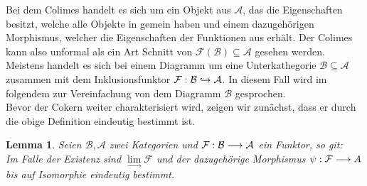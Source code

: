 \documentclass[10pt,a4paper]{report}
\newcounter{Aussage}[chapter]
\newtheorem{lemma}[Aussage]{Lemma}
\newcommand{\functionfront}[3]{\nolinebreak{#1:#2 \longrightarrow #3}}
\newcommand{\colimes}[0]{\lim\limits_{ \longrightarrow }}
\newcommand{\infunctionfront}[3]{\nolinebreak{#1:#2 \hookrightarrow #3}}
\begin{document}
Bei dem Colimes handelt es sich um ein Objekt aus $\mathcal{A}$, das die Eigenschaften besitzt, welche alle Objekte in  gemein haben und einem dazugehörigen Morphismus, welcher die Eigenschaften der Funktionen aus  erhält. Der Colimes kann also unformal als ein Art Schnitt von $\mathcal{F}(\mathcal{B}) \subseteq \mathcal{A}$ gesehen werden.\\
Meistens handelt es sich bei einem Diagramm um eine Unterkathegorie $\mathcal{B} \subseteq \mathcal{A}$ zusammen mit dem Inklusionsfunktor $\infunctionfront{\mathcal{F}}{\mathcal{B}}{\mathcal{A}}$. In diesem Fall wird im folgendem zur Vereinfachung von dem Diagramm $\mathcal{B}$ gesprochen.\\
Bevor der Cokern weiter charakterisiert wird, zeigen wir zunächst, dass er durch die obige Definition eindeutig bestimmt ist.
\begin{lemma}
Seien $\mathcal{B},\mathcal{A}$ zwei Kategorien und $\functionfront{\mathcal{F}}{\mathcal{B}}{\mathcal{A}}$ ein Funktor, so git:\\ 
Im Falle der Existenz sind $\colimes \mathcal{F}$ und der dazugehörige Morphismus $\functionfront{\psi}{\mathcal{F}}{A}$ bis auf Isomorphie eindeutig bestimmt.
\end{lemma}
\end{document}
